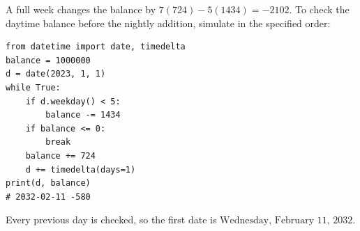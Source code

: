 A full week changes the balance by $7(724)-5(1434)=-2102$. To check the daytime balance before the nightly addition, simulate in the specified order:
\begin{verbatim}
from datetime import date, timedelta
balance = 1000000
d = date(2023, 1, 1)
while True:
    if d.weekday() < 5:
        balance -= 1434
    if balance <= 0:
        break
    balance += 724
    d += timedelta(days=1)
print(d, balance)
# 2032-02-11 -580
\end{verbatim}
Every previous day is checked, so the first date is $\boxed{\text{Wednesday, February 11, 2032}}$.
